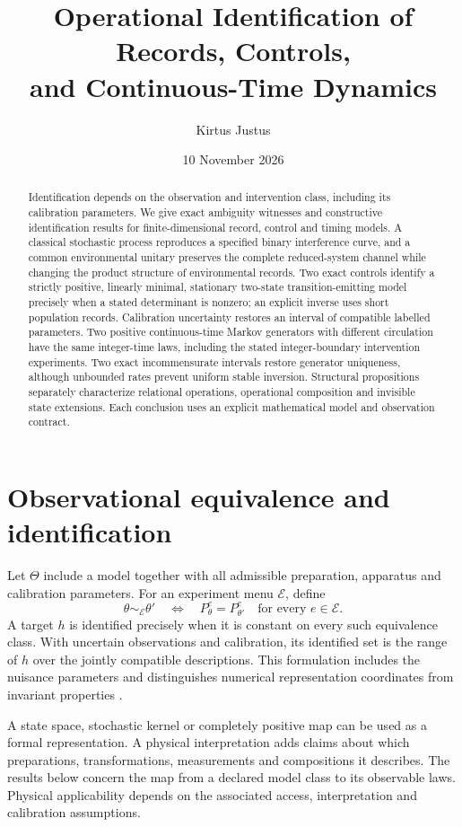 \documentclass[11pt,letterpaper]{article}
\title{\color{navy}Operational Identification of Records, Controls,\\
and Continuous-Time Dynamics}
\author{Kirtus Justus}
\date{10 November 2026}
\begin{document}
\maketitle
\begin{abstract}
Identification depends on the observation and intervention class, including its
calibration parameters. We give exact ambiguity witnesses and constructive
identification results for finite-dimensional record, control and timing models.
A classical stochastic process reproduces a specified binary interference curve,
and a common environmental unitary preserves the complete reduced-system channel
while changing the product structure of environmental records. Two exact controls
identify a strictly positive, linearly minimal, stationary two-state
transition-emitting model precisely when a stated determinant is nonzero;
an explicit inverse uses short population records. Calibration uncertainty
restores an interval of compatible labelled parameters. Two positive
continuous-time Markov generators with different circulation have the same
integer-time laws, including the stated integer-boundary intervention experiments.
Two exact incommensurate intervals restore generator uniqueness, although
unbounded rates prevent uniform stable inversion. Structural propositions
separately characterize relational operations, operational composition and
invisible state extensions. Each conclusion uses an explicit mathematical model
and observation contract.
\end{abstract}

\section{Observational equivalence and identification}

Let \(\Theta\) include a model together with all admissible preparation, apparatus
and calibration parameters. For an experiment menu \(\mathcal E\), define
\[
 \theta\sim_{\mathcal E}\theta'
 \quad\Longleftrightarrow\quad
 P_\theta^e=P_{\theta'}^e
 \quad\text{for every }e\in\mathcal E.
\]
A target \(h\) is identified precisely when it is constant on every such
equivalence class. With uncertain observations and calibration, its identified
set is the range of \(h\) over the jointly compatible descriptions. This
formulation includes the nuisance parameters and distinguishes numerical
representation coordinates from invariant properties \cite{internalcollection}.

A state space, stochastic kernel or completely positive map can be used as a
formal representation. A physical interpretation adds claims about which
preparations, transformations, measurements and compositions it describes.
The results below concern the map from a declared model class to its observable
laws. Physical applicability depends on the associated access, interpretation
and calibration assumptions.
\end{document}
